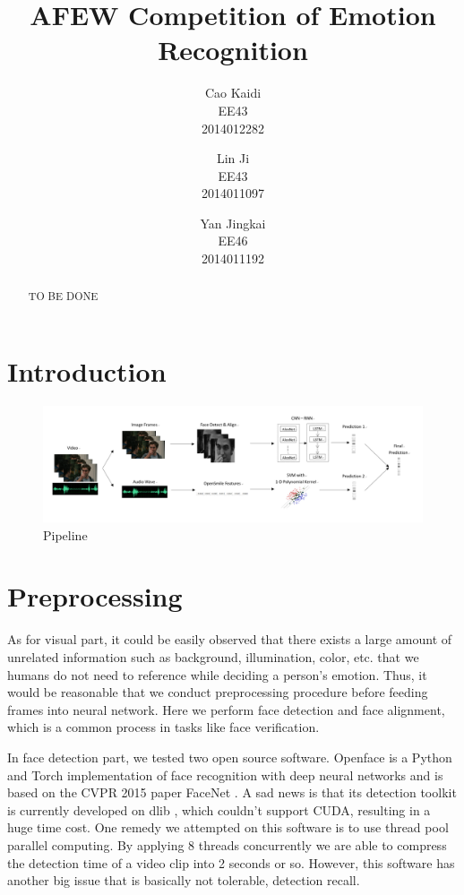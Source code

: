 \documentclass[10pt,twocolumn,letterpaper]{article}
\begin{document}
\title{AFEW Competition of Emotion Recognition}

\author{Cao Kaidi\\
EE43\\
2014012282
\and
Lin Ji\\
EE43\\
2014011097
\and
Yan Jingkai\\
EE46\\
2014011192
}

\maketitle

\begin{abstract}
   TO BE DONE
\end{abstract}

\section{Introduction}

\begin{figure}[htpb]
	\centering
	\includegraphics[width = \textwidth]{pic/pipeline.png}
	\caption{Pipeline}
\end{figure}

\section{Preprocessing}

As for visual part, it could be easily observed that there exists a large amount of unrelated information such as background, illumination, color, etc. that we humans do not need to reference while deciding a person's emotion. Thus, it would be reasonable that we conduct preprocessing procedure before feeding frames into neural network. Here we perform face detection and face alignment, which is a common process in tasks like face verification.

In face detection part, we tested two open source software. Openface \cite{amos2016openface} is a Python and Torch implementation of face recognition with deep neural networks and is based on the CVPR 2015 paper FaceNet \cite{schroff2015facenet}. A sad news is that its detection toolkit is currently developed on dlib \cite{king2009dlib}, which couldn't support CUDA, resulting in a huge time cost. One remedy we attempted on this software is to use thread pool parallel computing. By applying 8 threads concurrently we are able to compress the detection time of a video clip into 2 seconds or so. However, this software has another big issue that is basically not tolerable, detection recall.
\end{document}
